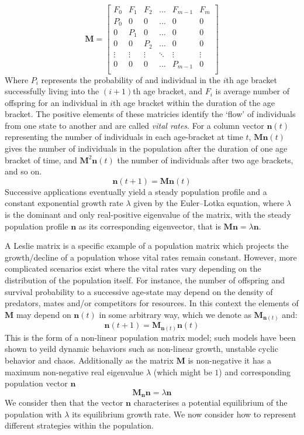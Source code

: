 \begin{equation*}
\mathbf{M}=\begin{bmatrix}
    F_0 & F_1 & F_2 & \dots & F_{m-1} & F_m  \\
    P_0 &  0  &  0  & \dots &  0      &  0   \\
     0  & P_1 &  0  & \dots &  0      &  0   \\
     0  &  0  & P_2 & \dots &  0      &  0   \\
    \vdots & \vdots & \vdots & \ddots & \vdots & \vdots \\
     0  &  0  &  0  & \dots  & P_{m-1} &  0   \\
\end{bmatrix}
\end{equation*}
Where $P_i$ represents the probability of and individual in the $i$th age bracket successfully living into the $(i+1)$th age bracket, and $F_i$ is average number of offspring for an individual in $i$th age bracket within the duration of the age bracket.
The positive elements of these matricies identify the `flow' of individuals from one state to another and are called \textit{vital rates}.
For a column vector $\mathbf{n}(t)$ representing the number of individuals in each age-bracket at time $t$, $\mathbf{M}\mathbf{n}(t)$ gives the number of individuals in the population after the duration of one age bracket of time, and $\mathbf{M}^2\mathbf{n}(t)$ the number of individuals after two age brackets, and so on. $$\mathbf{n}(t+1)=\mathbf{M}\mathbf{n}(t)$$
Successive applications eventually yield a steady population profile and a constant exponential growth rate $\lambda$ given by the Euler–Lotka equation, where $\lambda$ is the dominant and only real-positive eigenvalue of the matrix, with the steady population profile $\mathbf{n}$ as its corresponding eigenvector, that is $\mathbf{M}\mathbf{n}=\lambda \mathbf{n}$.

A Leslie matrix is a specific example of a population matrix which projects the growth/decline of a population whose vital rates remain constant.
However, more complicated scenarios exist where the vital rates vary depending on the distribution of the population itself.
For instance, the number of offspring and survival probability to a successive age-state may depend on the density of predators, mates and/or competitors for resources.
In this context the elements of $\mathbf{M}$ may depend on $\mathbf{n}(t)$ in some arbitrary way, which we denote as $\mathbf{M}_{\mathbf{n}(t)}$ and:
$$\mathbf{n}(t+1) = \mathbf{M}_{\mathbf{n}(t)}\mathbf{n}(t)$$
This is the form of a non-linear population matrix model; such models have been shown to yeild dynamic behaviors such as non-linear growth, unstable cyclic behavior and chaos.
Additionally as the matrix $\mathbf{M}$ is non-negative it has a maximum non-negative real eigenvalue $\lambda$ (which might be $1$) and corresponding population vector $\mathbf{n}$
$$\mathbf{M}_{\mathbf{n}}\mathbf{n} = \lambda\mathbf{n}$$
We consider then that the vector $\mathbf{n}$ characterises a potential equilibrium of the population with $\lambda$ its equilibrium growth rate. We now consider how to represent different strategies within the population.

